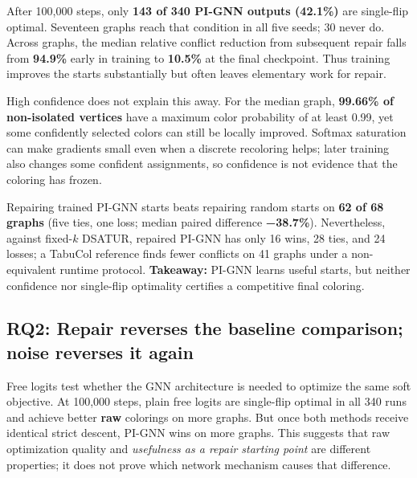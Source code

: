\documentclass[11pt,letterpaper,twocolumn]{article}
\begin{document}
After 100,000 steps, only \textbf{143 of 340 PI-GNN outputs (42.1\%)} are single-flip optimal. Seventeen graphs reach that condition in all five seeds; 30 never do. Across graphs, the median relative conflict reduction from subsequent repair falls from \textbf{94.9\%} early in training to \textbf{10.5\%} at the final checkpoint. Thus training improves the starts substantially but often leaves elementary work for repair.

High confidence does not explain this away. For the median graph, \textbf{99.66\% of non-isolated vertices} have a maximum color probability of at least 0.99, yet some confidently selected colors can still be locally improved. Softmax saturation can make gradients small even when a discrete recoloring helps; later training also changes some confident assignments, so confidence is not evidence that the coloring has frozen.

Repairing trained PI-GNN starts beats repairing random starts on \textbf{62 of 68 graphs} (five ties, one loss; median paired difference \textbf{−38.7\%}). Nevertheless, against fixed-\(k\) DSATUR, repaired PI-GNN has only 16 wins, 28 ties, and 24 losses; a TabuCol reference finds fewer conflicts on 41 graphs under a non-equivalent runtime protocol. \textbf{Takeaway:} PI-GNN learns useful starts, but neither confidence nor single-flip optimality certifies a competitive final coloring.

\subsection{RQ2: Repair reverses the baseline comparison; noise reverses it again}\label{rq2-repair-reverses-the-baseline-comparison-noise-reverses-it-again}

Free logits test whether the GNN architecture is needed to optimize the same soft objective. At 100,000 steps, plain free logits are single-flip optimal in all 340 runs and achieve better \textbf{raw} colorings on more graphs. But once both methods receive identical strict descent, PI-GNN wins on more graphs. This suggests that raw optimization quality and \emph{usefulness as a repair starting point} are different properties; it does not prove which network mechanism causes that difference.
\end{document}
